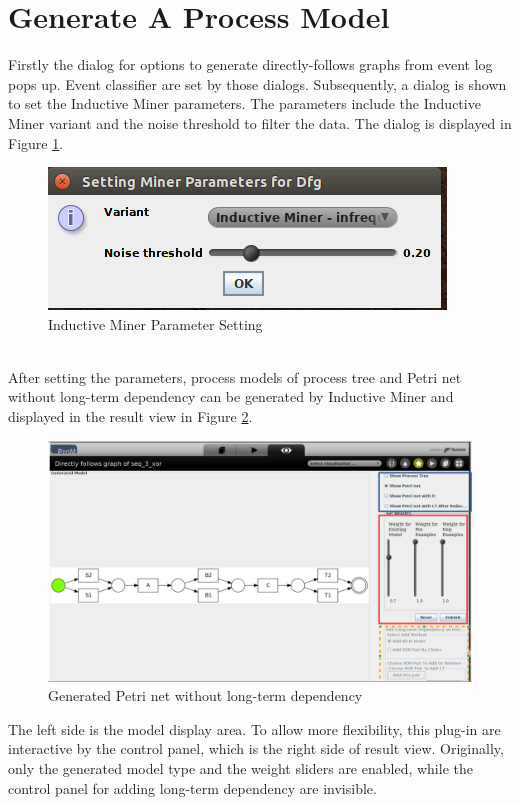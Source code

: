 \section{Generate A Process Model}
Firstly the dialog for options to generate directly-follows graphs from event log pops up. Event classifier are set by those dialogs. Subsequently, a dialog is shown to set the Inductive Miner parameters. The parameters include the Inductive Miner variant and the noise threshold to filter the data. The dialog is displayed in Figure \ref{fig:dfg-IM-setting}.
\begin{figure}
	\centering
	\includegraphics[scale=0.75]{figures/implementation/dfg-IM-setting.png}
	\caption{Inductive Miner Parameter Setting}
	\label{fig:dfg-IM-setting}
\end{figure} \\
After setting the parameters, process models  of process tree and Petri net without long-term dependency can be generated by Inductive Miner and displayed in the result view in Figure \ref{fig:dfg-IM-pn-without-lt}. 
\begin{figure}
	\centering
	\includegraphics[width=\textwidth]{figures/implementation/dfg-IM-pn-without-lt.png}
	\caption{Generated Petri net without long-term dependency}
	\label{fig:dfg-IM-pn-without-lt}
\end{figure}
The left side is the model display area. To allow more flexibility, this plug-in are interactive by the control panel, which is the right side of result view. Originally, only the generated model type and the weight sliders are enabled, while the control panel for adding long-term dependency are invisible. 

